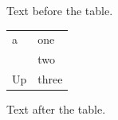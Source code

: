 \documentclass[12pt]{article}
\begin{document}
Text before the table.

\begin{tabular}{ll}a & one\\ & two\\\multirow{-2}{*}{Up} & three\\\end{tabular}

Text after the table.
\end{document}
